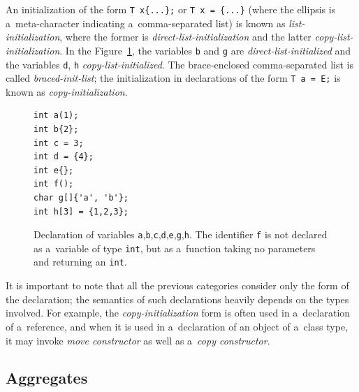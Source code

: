 \documentclass[nolot,nolof,nocover,printed]{fithesis3}
\begin{document}
An initialization of the form \lstinline|T x{...};| or \lstinline|T x = {...}| (where the ellipsis is a~meta-character indicating a~comma-separated list) is known as \textit{list-initialization}, where the former is \textit{direct-list-initialization} and the latter \textit{copy-list-initialization}. In the Figure~\ref{fig:initializers}, the variables \lstinline|b| and \lstinline|g| are \textit{direct-list-initialized} and the variables \lstinline|d|, \lstinline|h| \textit{copy-list-initialized}. The brace-enclosed comma-separated list is called \textit{braced-init-list}; the initialization in declarations of the form \lstinline|T a = E;| is known as \textit{copy-initialization}.

\begin{figure}[ht]
\begin{lstlisting}
int a(1);
int b{2};
int c = 3;
int d = {4};
int e{};
int f();
char g[]{'a', 'b'};
int h[3] = {1,2,3};
\end{lstlisting}
\caption[Declarations and initializers]{Declaration of variables \lstinline|a|,\lstinline|b|,\lstinline|c|,\lstinline|d|,\lstinline|e|,\lstinline|g|,\lstinline|h|. The identifier \lstinline|f| is not declared as a~variable of type \lstinline|int|, but as a~function taking no parameters and returning an \lstinline|int|.}
\label{fig:initializers}
\end{figure}

It is important to note that all the previous categories consider only the form of the declaration; the semantics of such declarations heavily depends on the types involved. For example, the \textit{copy-initialization} form is often used in a~declaration of a~reference, and when it is used in a~declaration of an object of a~class type, it may invoke \textit{move constructor} as well as a~\textit{copy constructor}.



\subsection{Aggregates}
\end{document}
